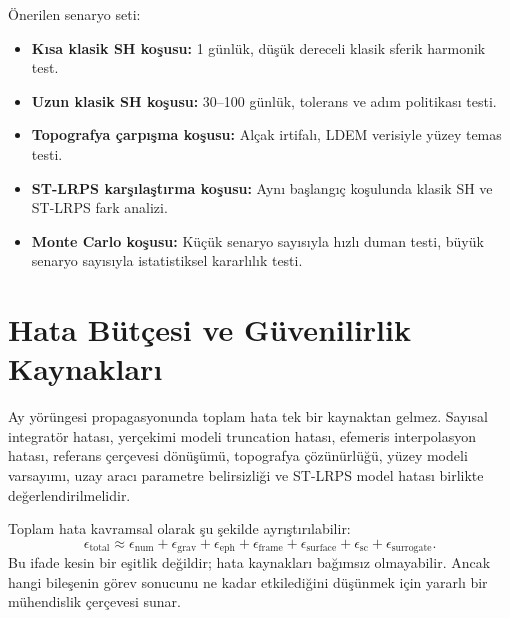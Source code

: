 Önerilen senaryo seti:
\begin{itemize}
    \item \textbf{Kısa klasik SH koşusu:} 1 günlük, düşük dereceli klasik sferik harmonik test.
    \item \textbf{Uzun klasik SH koşusu:} 30--100 günlük, tolerans ve adım politikası testi.
    \item \textbf{Topografya çarpışma koşusu:} Alçak irtifalı, LDEM verisiyle yüzey temas testi.
    \item \textbf{ST-LRPS karşılaştırma koşusu:} Aynı başlangıç koşulunda klasik SH ve ST-LRPS fark analizi.
    \item \textbf{Monte Carlo koşusu:} Küçük senaryo sayısıyla hızlı duman testi, büyük senaryo sayısıyla istatistiksel kararlılık testi.
\end{itemize}

\section{Hata Bütçesi ve Güvenilirlik Kaynakları}
\label{sec:error_budget}

Ay yörüngesi propagasyonunda toplam hata tek bir kaynaktan gelmez. Sayısal integratör hatası, yerçekimi modeli truncation hatası, efemeris interpolasyon hatası, referans çerçevesi dönüşümü, topografya çözünürlüğü, yüzey modeli varsayımı, uzay aracı parametre belirsizliği ve ST-LRPS model hatası birlikte değerlendirilmelidir.

Toplam hata kavramsal olarak şu şekilde ayrıştırılabilir:
\[
\epsilon_{\mathrm{total}}
\approx
\epsilon_{\mathrm{num}}
+ \epsilon_{\mathrm{grav}}
+ \epsilon_{\mathrm{eph}}
+ \epsilon_{\mathrm{frame}}
+ \epsilon_{\mathrm{surface}}
+ \epsilon_{\mathrm{sc}}
+ \epsilon_{\mathrm{surrogate}}.
\]
Bu ifade kesin bir eşitlik değildir; hata kaynakları bağımsız olmayabilir. Ancak hangi bileşenin görev sonucunu ne kadar etkilediğini düşünmek için yararlı bir mühendislik çerçevesi sunar.

